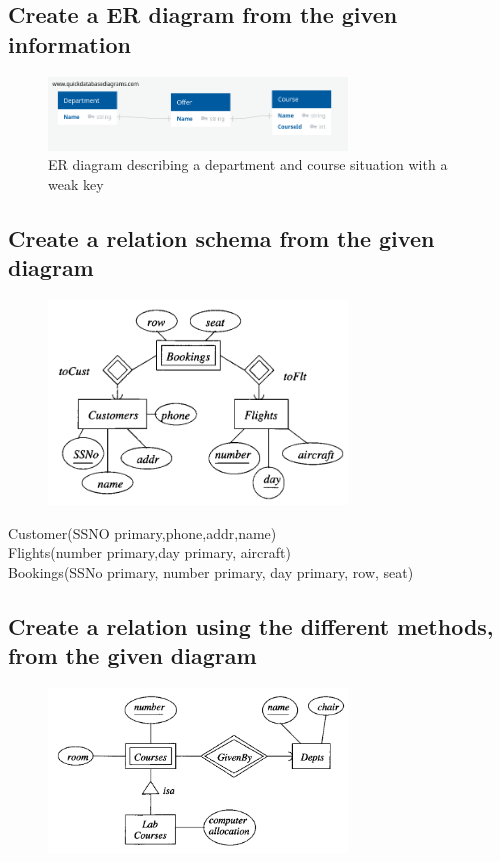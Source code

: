 \documentclass[12pt, a4paper]{article}
\begin{document}
		 	\subsection{Create a ER diagram from the given information}
				\begin{figure}[h!]
						  \centering
						  \includegraphics[width=300px]{assets/W12E3.png}
						  \caption{ER diagram describing a department and course situation with a weak key}
				\end{figure}
			\subsection{Create a relation schema from the given diagram}
				\begin{figure}[h!]
						  \centering
						  \includegraphics[width=300px]{assets/W12E4.png}
				\end{figure}
		 		Customer(SSNO primary,phone,addr,name)\\
				Flights(number primary,day primary, aircraft)\\
				Bookings(SSNo primary, number primary, day primary, row, seat)
			\subsection{Create a relation using the different methods, from the given diagram}
				\begin{figure}[h!]
						  \centering
						  \includegraphics[width=300px]{assets/W12E5.png}
				\end{figure}
\end{document}
